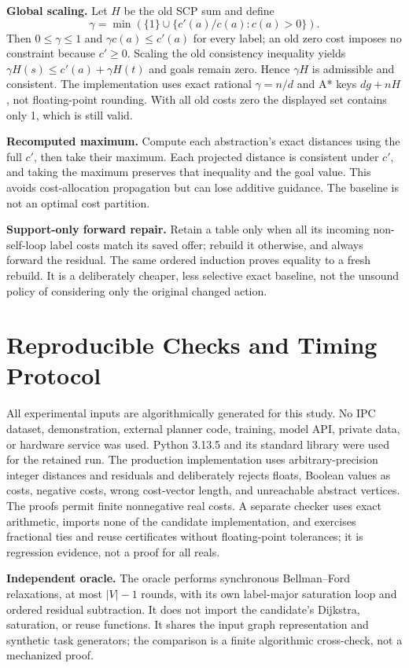 \textbf{Global scaling.} Let $H$ be the old SCP sum and define
\[
 \gamma=\min\left(\{1\}\cup\{c'(a)/c(a):c(a)>0\}\right).
\]
Then $0\leq\gamma\leq1$ and $\gamma c(a)\leq c'(a)$ for every label; an old zero cost imposes no constraint because $c'\geq0$. Scaling the old consistency inequality yields $\gamma H(s)\leq c'(a)+\gamma H(t)$ and goals remain zero. Hence $\gamma H$ is admissible and consistent. The implementation uses exact rational $\gamma=n/d$ and A* keys $dg+nH$, not floating-point rounding. With all old costs zero the displayed set contains only 1, which is still valid.

\textbf{Recomputed maximum.} Compute each abstraction's exact distances using the full $c'$, then take their maximum. Each projected distance is consistent under $c'$, and taking the maximum preserves that inequality and the goal value. This avoids cost-allocation propagation but can lose additive guidance. The baseline is not an optimal cost partition.

\textbf{Support-only forward repair.} Retain a table only when all its incoming non-self-loop label costs match its saved offer; rebuild it otherwise, and always forward the residual. The same ordered induction proves equality to a fresh rebuild. It is a deliberately cheaper, less selective exact baseline, not the unsound policy of considering only the original changed action.

\section{Reproducible Checks and Timing Protocol}
All experimental inputs are algorithmically generated for this study. No IPC dataset, demonstration, external planner code, training, model API, private data, or hardware service was used. Python 3.13.5 and its standard library were used for the retained run. The production implementation uses arbitrary-precision integer distances and residuals and deliberately rejects floats, Boolean values as costs, negative costs, wrong cost-vector length, and unreachable abstract vertices. The proofs permit finite nonnegative real costs. A separate checker uses exact  arithmetic, imports none of the candidate implementation, and exercises fractional ties and reuse certificates without floating-point tolerances; it is regression evidence, not a proof for all reals.

\textbf{Independent oracle.} The oracle performs synchronous Bellman--Ford relaxations, at most $|V|-1$ rounds, with its own label-major saturation loop and ordered residual subtraction. It does not import the candidate's Dijkstra, saturation, or reuse functions. It shares the input graph representation and synthetic task generators; the comparison is a finite algorithmic cross-check, not a mechanized proof.

